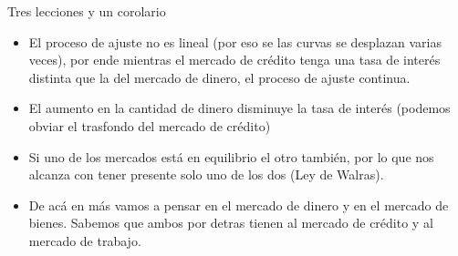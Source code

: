 \documentclass{beamer}
\begin{document}
\begin{frame}{Tres lecciones y un corolario}
    \begin{itemize}
        \item El proceso de ajuste no es lineal (por eso se las curvas se desplazan varias veces), por ende mientras el mercado de crédito tenga una tasa de interés distinta que la del mercado de dinero, el proceso de ajuste continua.
        \item El aumento en la cantidad de dinero disminuye la tasa de interés (podemos obviar el trasfondo del mercado de crédito)
        \item Si uno de los mercados está en equilibrio el otro también, por lo que nos alcanza con tener presente solo uno de los dos (Ley de Walras).
        \item De acá en más vamos a pensar en el mercado de dinero y en el mercado de bienes. Sabemos que ambos por detras tienen al mercado de crédito y al mercado de trabajo.
    \end{itemize}
\end{frame}
\end{document}
